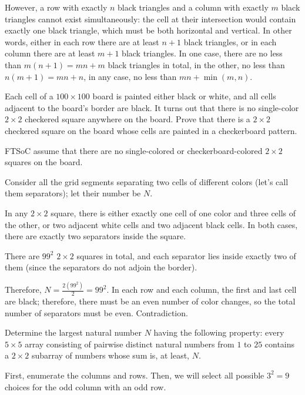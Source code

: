 However, a row with exactly $n$ black triangles and a column with exactly $m$ black triangles cannot exist simultaneously: the cell at their intersection would contain exactly one black triangle, which must be both horizontal and vertical. In other words, either in each row there are at least $n+1$ black triangles, or in each column there are at least $m+1$ black triangles. In one case, there are no less than $m(n+1)=mn+m$ black triangles in total, in the other, no less than $n(m+1)=mn+n$, in any case, no less than $mn+\min(m,n)$.

\begin{example} 
    Each cell of a $100\times 100$ board is painted either black or white, and all cells adjacent to the board's border are black. It turns out that there is no single-color $2\times 2$ checkered square anywhere on the board. Prove that there is a $2\times 2$ checkered square on the board whose cells are painted in a checkerboard pattern.
\end{example}

\sol FTSoC assume that there are no single-colored or checkerboard-colored $2\times 2$ squares on the board.

Consider all the grid segments separating two cells of different colors (let's call them separators); let their number be $N$.

In any $2\times 2$ square, there is either exactly one cell of one color and three cells of the other, or two adjacent white cells and two adjacent black cells. In both cases, there are exactly two separators inside the square.

There are $99^2$ $2\times 2$ squares in total, and each separator lies inside exactly two of them (since the separators do not adjoin the border).

Therefore, $N = \frac{2(99^2)}{2} = 99^2$. In each row and each column, the first and last cell are black; therefore, there must be an even number of color changes, so the total number of separators must be even. Contradiction.

\begin{example} [BMOSL 2019]
    Determine the largest natural number $N$ having the following property: every $5\times 5$ array consisting of pairwise distinct natural numbers from $1$ to $25$ contains a $2\times 2$ subarray of numbers whose sum is, at least, $N$.
\end{example}


First, enumerate the columns and rows. Then, we will select all possible $3^2 = 9$ choices for the odd column with an odd row.

